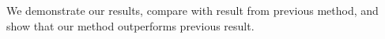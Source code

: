 We demonstrate our results, compare with result from previous method, and show that our method outperforms previous result.
